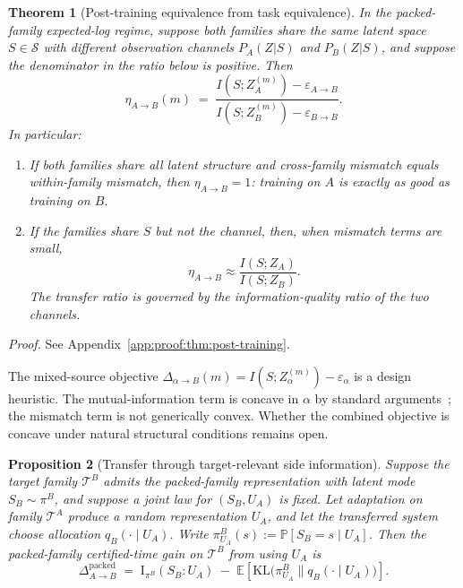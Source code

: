\documentclass[10pt]{article}
\theoremstyle{paperplain}
\newtheorem{theorem}{Theorem}[section]
\newtheorem{proposition}[theorem]{Proposition}
\theoremstyle{paperdefinition}
\theoremstyle{paperremark}
\newcommand{\KL}{\mathrm{KL}}
\newcommand{\I}{\mathrm{I}}
\newcommand{\E}{\mathbb{E}}
\newcommand{\Prb}{\mathbb{P}}
\newcommand{\cS}{\mathcal{S}}
\newcommand{\cT}{\mathcal{T}}
\begin{document}
\begin{theorem}[Post-training equivalence from task equivalence]
\label{thm:post-training}
In the packed-family expected-log regime, suppose both families share the same latent space $S \in \cS$ with different observation channels $P_A(Z|S)$ and $P_B(Z|S)$, and suppose the denominator in the ratio below is positive.
Then
\begin{equation}
\label{eq:post-training-ratio}
\eta_{A \to B}(m) \;=\; \frac{I(S;Z_A^{(m)}) - \varepsilon_{A \to B}}{I(S;Z_B^{(m)}) - \varepsilon_{B \to B}}.
\end{equation}
In particular:
\begin{enumerate}
\item[\textup{(i)}] If both families share all latent structure and cross-family mismatch equals within-family mismatch, then $\eta_{A \to B} = 1$: training on $A$ is exactly as good as training on $B$.
\item[\textup{(ii)}] If the families share $S$ but not the channel, then, when mismatch terms are small,
\[
\eta_{A \to B} \approx \frac{I(S;Z_A)}{I(S;Z_B)}.
\]
The transfer ratio is governed by the information-quality ratio of the two channels.
\end{enumerate}
\end{theorem}

\par\noindent\emph{Proof.} See Appendix~\ref{app:proof:thm:post-training}.\par


The mixed-source objective $\Delta_{\alpha \to B}(m) = I(S; Z_\alpha^{(m)}) - \varepsilon_\alpha$ is a design heuristic. The mutual-information term is concave in $\alpha$ by standard arguments~\cite{cover-thomas2006}; the mismatch term is not generically convex. Whether the combined objective is concave under natural structural conditions remains open.

\begin{proposition}[Transfer through target-relevant side information]
\label{prop:transfer-side-info}
Suppose the target family $\cT^B$ admits the packed-family representation with latent mode $S_B \sim \pi^B$, and suppose a joint law for $(S_B,U_A)$ is fixed.
Let adaptation on family $\cT^A$ produce a random representation $U_A$, and let the transferred system choose allocation $q_B(\cdot \mid U_A)$.
Write $\pi^B_{U_A}(s) := \Prb[S_B = s \mid U_A]$.
Then the packed-family certified-time gain on $\cT^B$ from using $U_A$ is
\begin{equation}
\label{eq:transfer-gain}
\Delta^{\mathrm{packed}}_{A \to B}
\;=\; \I_{\pi^B}(S_B : U_A)
\;-\; \E\!\left[\KL\bigl(\pi^B_{U_A} \| q_B(\cdot \mid U_A)\bigr)\right].
\end{equation}
\end{proposition}
\end{document}
